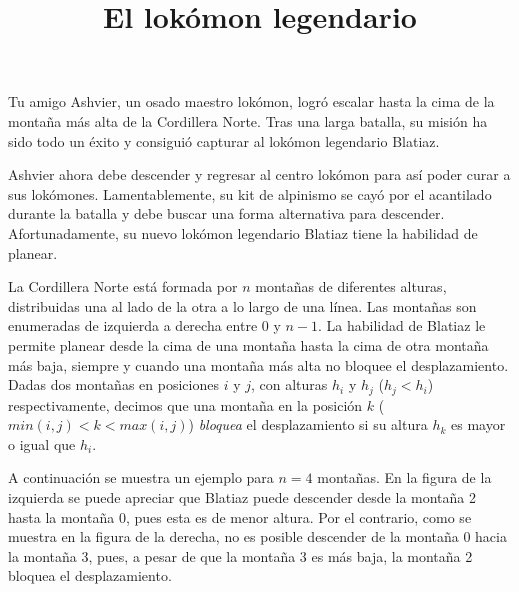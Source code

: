 \documentclass{oci}
\title{El lokómon legendario}
\begin{document}
\begin{problemDescription}

Tu amigo Ashvier, un osado maestro lokómon, logró escalar hasta la cima de la montaña más alta de
la Cordillera Norte.
Tras una larga batalla, su misión ha sido todo un éxito y consiguió capturar al lokómon legendario Blatiaz.

Ashvier ahora debe descender y regresar al centro lokómon
para así poder curar a sus lokómones.
Lamentablemente, su kit de alpinismo se cayó por el acantilado durante la batalla y debe buscar
una forma alternativa para descender.
Afortunadamente, su nuevo lokómon legendario Blatiaz tiene la habilidad de planear.

La Cordillera Norte está formada por $n$ montañas de diferentes alturas, distribuidas una al lado
de la otra a lo largo de una línea.
Las montañas son enumeradas de izquierda a derecha entre 0 y $n-1$.
La habilidad de Blatiaz le permite planear desde la cima de una montaña
hasta la cima de otra montaña más baja, siempre y cuando una montaña más alta no bloquee
el desplazamiento.
Dadas dos montañas en posiciones $i$ y $j$, con alturas $h_i$ y $h_j$ ($h_j < h_i$) respectivamente,
decimos que una montaña en la posición $k$ ($min(i, j) < k < max(i, j)$) \emph{bloquea} el
desplazamiento si su altura $h_k$ es mayor o igual que $h_i$.


A continuación se muestra un ejemplo para $n=4$ montañas.
En la figura de la izquierda se puede apreciar que Blatiaz puede descender desde la montaña 2
hasta la montaña 0, pues esta es de menor altura.
Por el contrario, como se muestra en la figura de la derecha, no es posible descender de la
montaña 0 hacia la montaña 3, pues, a pesar de que la montaña 3 es más baja, la montaña 2 bloquea el
desplazamiento.


\end{problemDescription}
\end{document}
